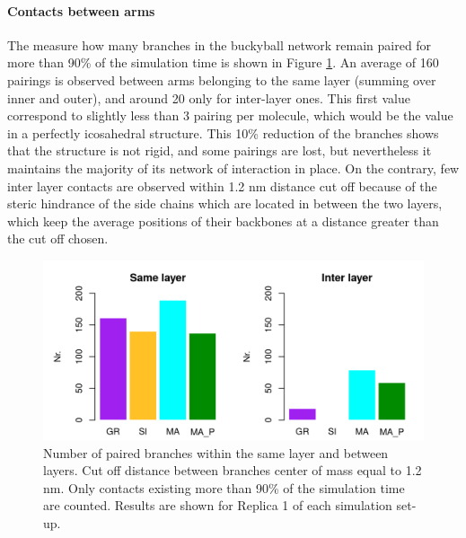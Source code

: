 \paragraph{Contacts between arms} The measure how many branches in the buckyball network remain paired for more than 90\% of the simulation time is shown in Figure \ref{fig:BTI_beta}. An average of 160 pairings is observed between arms belonging to the same layer (summing over inner and outer), and around 20 only for inter-layer ones.
%
This first value correspond to slightly less than 3 pairing per molecule, which would be the value in a perfectly icosahedral structure. This 10\% reduction of the branches shows that the structure is not rigid, and some pairings are lost, but nevertheless it maintains the majority of its network of interaction in place.
%
On the contrary, few inter layer contacts are observed within 1.2 nm distance cut off because of the steric hindrance of the side chains which are located in between the two layers, which keep the average positions of their backbones at a distance greater than the cut off chosen.
%
\begin{figure}[t!]
\centering
\includegraphics[width=0.85\linewidth]{3results_capsule/pics/stAll_beta_90_R1.png}
\caption[Branch pairing during simulations of the buckyball]{Number of paired branches within the same layer and between layers. Cut off distance between branches center of mass equal to 1.2 nm. Only contacts existing more than 90\% of the simulation time are counted. Results are shown for Replica 1 of each simulation set-up.}
\label{fig:BTI_beta}
\end{figure}

